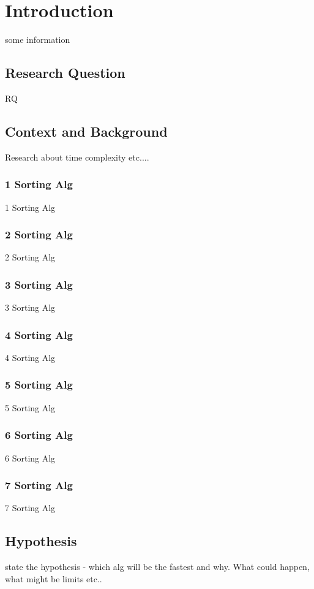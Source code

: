 

\section{Introduction}
some information 

\subsection{Research Question}
RQ

\subsection{Context and Background}
Research about time complexity etc.... 

\subsubsection{1 Sorting Alg}
1 Sorting Alg

\subsubsection{2 Sorting Alg}
2 Sorting Alg


\subsubsection{3 Sorting Alg}
3 Sorting Alg

\subsubsection{4 Sorting Alg}
4 Sorting Alg


\subsubsection{5 Sorting Alg}
5 Sorting Alg


\subsubsection{6 Sorting Alg}
6 Sorting Alg


\subsubsection{7 Sorting Alg}
7 Sorting Alg


\subsection{Hypothesis}
state the hypothesis -  which alg will be the fastest and why. What could happen, what might be limits etc.. \\



